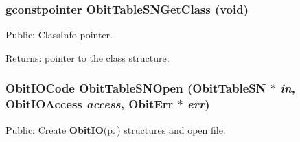 \subsubsection{\setlength{\rightskip}{0pt plus 5cm}gconstpointer Obit\-Table\-SNGet\-Class (void)}\label{ObitTableSN_8h_a13}


Public: Class\-Info pointer. 

\begin{Desc}
\item[Returns:]pointer to the class structure. \end{Desc}
\subsubsection{\setlength{\rightskip}{0pt plus 5cm}Obit\-IOCode Obit\-Table\-SNOpen ({\bf Obit\-Table\-SN} $\ast$ {\em in}, Obit\-IOAccess {\em access}, {\bf Obit\-Err} $\ast$ {\em err})}\label{ObitTableSN_8h_a17}


Public: Create {\bf Obit\-IO}{\rm (p.\,\pageref{structObitIO})} structures and open file. 

